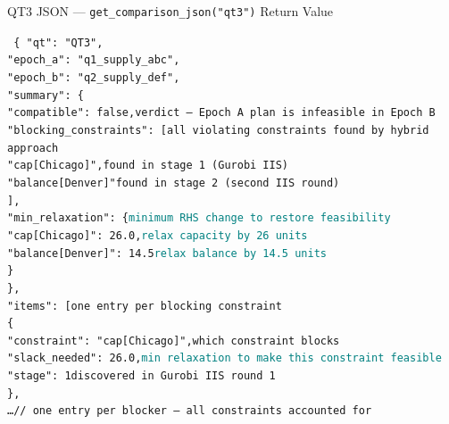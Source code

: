 \documentclass[aspectratio=169,10pt]{beamer}
\begin{document}
\begin{frame}[t]{QT3 JSON — \texttt{get\_comparison\_json("qt3")} Return Value}
\vspace{1pt}
\begin{block}{}
  \texttt{\scriptsize
    \{\,"qt": "QT3",\\
    \quad "epoch\_a": "q1\_supply\_abc",\\
    \quad "epoch\_b": "q2\_supply\_def",\\[1pt]
    \quad "summary": \{\\
    \quad\quad "compatible": false,\hfill\textcolor{ared}{\tiny verdict — Epoch A plan is infeasible in Epoch B}\\[1pt]
    \quad\quad "blocking\_constraints": [\hfill\textcolor{pblue}{\tiny all violating constraints found by hybrid approach}\\
    \quad\quad\quad "cap[Chicago]",\hfill\textcolor{pblue}{\tiny found in stage 1 (Gurobi IIS)}\\
    \quad\quad\quad "balance[Denver]"\hfill\textcolor{pblue}{\tiny found in stage 2 (second IIS round)}\\
    \quad\quad ],\\[1pt]
    \quad\quad "min\_relaxation": \{\hfill\textcolor{teal}{\tiny minimum RHS change to restore feasibility}\\
    \quad\quad\quad "cap[Chicago]": 26.0,\hfill\textcolor{teal}{\tiny relax capacity by 26 units}\\
    \quad\quad\quad "balance[Denver]": 14.5\hfill\textcolor{teal}{\tiny relax balance by 14.5 units}\\
    \quad\quad \}\\
    \quad \},\\[1pt]
    \quad "items": [\hfill\textcolor{mgray}{\tiny one entry per blocking constraint}\\
    \quad\quad \{\\
    \quad\quad\quad "constraint": "cap[Chicago]",\hfill\textcolor{mgray}{\tiny which constraint blocks}\\
    \quad\quad\quad "slack\_needed": 26.0,\hfill\textcolor{teal}{\tiny min relaxation to make this constraint feasible}\\
    \quad\quad\quad "stage": 1\hfill\textcolor{aorng}{\tiny discovered in Gurobi IIS round 1}\\
    \quad\quad \},\\
    \quad\quad \ldots\quad\textcolor{mgray}{// one entry per blocker — all constraints accounted for}\\
}
\end{block}
\end{frame}
\end{document}
